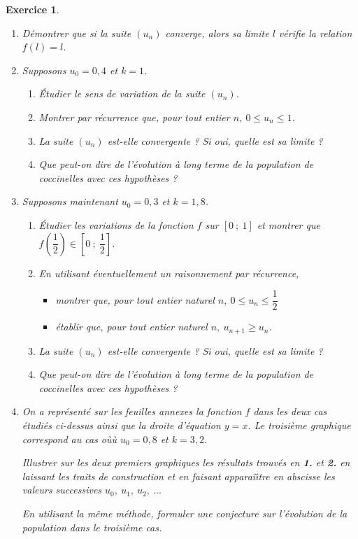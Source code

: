 \documentclass[12pt,a4paper,french]{article}
\theoremstyle{break}
\newtheorem{exercice}{Exercice}
\theoremstyle{nonumberplain}
\theoremstyle{nonumberbreak}
\begin{document}
\begin{exercice}
  \begin{enumerate}
    \item Démontrer que si la suite $\left(u_{n}\right)$
      converge, alors sa limite $l$ vérifie la relation $f(l) = l$.
    \item Supposons $u_{0} = 0,4$ et $k = 1$.
      \begin{enumerate}
        \item Étudier le sens de variation de la suite
          $\left(u_{n}\right)$.
        \item Montrer par récurrence que, pour tout entier $n,~ 0
          \leqslant u_{n} \leqslant 1$.
        \item La suite $\left(u_{n}\right)$ est-elle convergente ? Si
          oui, quelle est sa limite ?
        \item Que peut-on dire de l'évolution à long terme de la
          population de coccinelles avec ces hypothèses ?
      \end{enumerate}
    \item Supposons maintenant $u_{0} = 0,3$ et $k = 1,8$.
      \begin{enumerate}
        \item Étudier les variations de la fonction $f$
          sur $[0~;~ 1]$ et montrer que $f\left(\dfrac{1}{2}\right) \in
          \left[0~;~\dfrac{1}{2}\right]$.
        \item En utilisant éventuellement un raisonnement par
          récurrence,
          \begin{itemize}
            \item  montrer que, pour tout entier naturel $n,~ 0
              \leqslant u_{n} \leqslant \dfrac{1}{2}$
          \item  établir que, pour tout entier naturel $n,~ u_{n+1}
            \geqslant u_{n}$.
        \end{itemize}
      \item La suite $\left(u_{n}\right)$ est-elle convergente ? Si
        oui, quelle est sa limite ?
      \item Que peut-on dire de l'évolution à long terme de la
        population de coccinelles avec ces hypothèses ?
    \end{enumerate}
  \item On a représenté sur les feuilles annexes la fonction $f$ dans
    les deux cas étudiés ci-dessus ainsi que la droite d'équation $y =
    x$. Le troisième graphique correspond au cas où\`u $u_{0} = 0,8$
    et $k = 3,2$.

    Illustrer sur les deux premiers graphiques les résultats trouvés
    en \textbf{1.} et \textbf{2.} en laissant les traits de
    construction et en faisant apparaî\^{\i}tre en abscisse les
    valeurs successives $u_{0},~u_{1},~u_{2},~\ldots$

    En utilisant la même méthode, formuler une conjecture sur
    l'évolution de la population dans le troisième cas.
  \end{enumerate}
\end{exercice}
\end{document}
